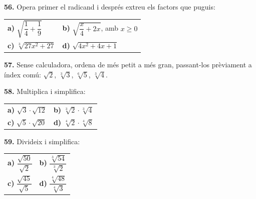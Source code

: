 \documentclass[13pt,a4paper]{extarticle}
\begin{document}
\par\noindent\begin{minipage}{\linewidth}
\textbf{56.} Opera primer el radicand i després extreu els factors que puguis:\par

\begin{tabular}{@{}p{.46\linewidth}p{.46\linewidth}@{}}
\textbf{a)} $\sqrt{\dfrac{1}{4}+\dfrac{1}{9}}$ & \textbf{b)} $\sqrt{\dfrac{x}{4}+2x}$, amb $x\geq 0$ \\[2pt]
\textbf{c)} $\sqrt[3]{27x^2+27}$ & \textbf{d)} $\sqrt{4x^2+4x+1}$ \\[2pt]
\end{tabular}\par
\end{minipage}\par\vspace{1.6mm}
\par\noindent\begin{minipage}{\linewidth}
\textbf{57.} Sense calculadora, ordena de més petit a més gran, passant-los prèviament a índex comú: $\sqrt{2}$, $\sqrt[3]{3}$, $\sqrt[6]{5}$, $\sqrt[3]{4}$.\par
\end{minipage}\par\vspace{1.6mm}
\par\noindent\begin{minipage}{\linewidth}
\textbf{58.} Multiplica i simplifica:\par

\begin{tabular}{@{}p{.46\linewidth}p{.46\linewidth}@{}}
\textbf{a)} $\sqrt{3}\cdot\sqrt{12}$ & \textbf{b)} $\sqrt[3]{2}\cdot\sqrt[3]{4}$ \\[2pt]
\textbf{c)} $\sqrt{5}\cdot\sqrt{20}$ & \textbf{d)} $\sqrt[4]{2}\cdot\sqrt[4]{8}$ \\[2pt]
\end{tabular}\par
\end{minipage}\par\vspace{1.6mm}
\par\noindent\begin{minipage}{\linewidth}
\textbf{59.} Divideix i simplifica:\par

\begin{tabular}{@{}p{.46\linewidth}p{.46\linewidth}@{}}
\textbf{a)} $\dfrac{\sqrt{50}}{\sqrt{2}}$ & \textbf{b)} $\dfrac{\sqrt[3]{54}}{\sqrt[3]{2}}$ \\[2pt]
\textbf{c)} $\dfrac{\sqrt{45}}{\sqrt{5}}$ & \textbf{d)} $\dfrac{\sqrt[4]{48}}{\sqrt[4]{3}}$ \\[2pt]
\end{tabular}\par
\end{minipage}\par\vspace{1.6mm}
\end{document}

